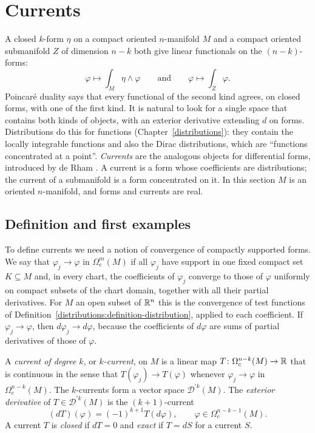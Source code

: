 \section{Currents}\label{de-rham:section-currents}

A closed $k$-form $\eta$ on a compact oriented $n$-manifold $M$ and a compact oriented submanifold $Z$ of dimension $n - k$ both give linear functionals on the $(n-k)$-forms:
\[
\varphi \longmapsto \int_M\eta \wedge \varphi \qquad \text{and} \qquad \varphi \longmapsto \int_Z\varphi .
\]
Poincar\'e duality says that every functional of the second kind agrees, on closed forms, with one of the first kind. It is natural to look for a single space that contains both kinds of objects,
with an exterior derivative extending $d$ on forms. Distributions do this for functions (Chapter~\ref{distributions}): they contain the locally integrable functions and also the Dirac
distributions, which are ``functions concentrated at a point''. \emph{Currents} are the analogous objects for differential forms, introduced by de Rham \cite{de-rham-book}. A current is a
form whose coefficients are distributions; the current of a submanifold is a form concentrated on it. In this section $M$ is an oriented $n$-manifold, and forms and currents are real.

\subsection{Definition and first examples}\label{de-rham:subsection-currents-definition}

To define currents we need a notion of convergence of compactly supported forms. We say that $\varphi_j \to \varphi$ in $\Omega^m_c(M)$ if all $\varphi_j$ have support in one fixed compact
set $K \subseteq M$ and, in every chart, the coefficients of $\varphi_j$ converge to those of $\varphi$ uniformly on compact subsets of the chart domain, together with all their partial
derivatives. For $M$ an open subset of $\mathbb{R}^n$ this is the convergence of test functions of Definition~\ref{distributions:definition-distribution}, applied to each coefficient. If
$\varphi_j \to \varphi$, then $d\varphi_j \to d\varphi$, because the coefficients of $d\varphi$ are sums of partial derivatives of those of $\varphi$.

\begin{definition}\label{de-rham:definition-current}
A \emph{current of degree $k$}, or \emph{$k$-current}, on $M$ is a linear map $T \colon \Omega^{n-k}_c(M) \to \mathbb{R}$ that is continuous in the sense that $T(\varphi_j) \to T(\varphi)$ whenever
$\varphi_j \to \varphi$ in $\Omega^{n-k}_c(M)$. The $k$-currents form a vector space $\mathcal{D}^{\prime k}(M)$. The \emph{exterior derivative} of $T \in \mathcal{D}^{\prime k}(M)$ is the
$(k+1)$-current
\[
(dT)(\varphi) = (-1)^{k+1}T(d\varphi), \qquad \varphi \in \Omega^{n-k-1}_c(M).
\]
A current $T$ is \emph{closed} if $dT = 0$ and \emph{exact} if $T = dS$ for a current $S$.
\end{definition}

